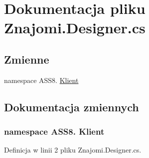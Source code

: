 \hypertarget{a00058}{
\section{Dokumentacja pliku Znajomi.Designer.cs}
\label{d7/df7/a00058}
}
\subsection*{Zmienne}
\begin{CompactItemize}
\item 
﻿namespace ASS8. \hyperlink{a00058_50d8d80fabd02a9a24fb725624e1ad24}{Klient}
\end{CompactItemize}


\subsection{Dokumentacja zmiennych}
\hypertarget{a00058_50d8d80fabd02a9a24fb725624e1ad24}{
\subsubsection[{Klient}]{\setlength{\rightskip}{0pt plus 5cm}﻿namespace ASS8. Klient}}
\label{d7/df7/a00058_50d8d80fabd02a9a24fb725624e1ad24}




Definicja w linii 2 pliku Znajomi.Designer.cs.